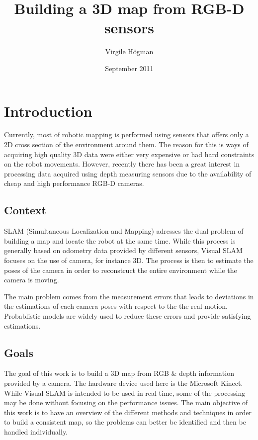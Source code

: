 \documentclass[a4paper,11pt]{kth-mag}
\title{Building a 3D map from RGB-D sensors}
\author{Virgile H\"{o}gman}
\date{September 2011}
\begin{document}
\frontmatter
\maketitle

\clearpage
{}
\clearpage
\tableofcontents
\mainmatter

\chapter{Introduction}

Currently, most of robotic mapping is performed using sensors that offers only a 2D cross section of the environment around them. The reason for this is ways of acquiring high quality 3D data were either very expensive or had hard constraints on the robot movements. However, recently there has been a great interest in processing data acquired using depth measuring sensors due to the availability of cheap and high performance RGB-D cameras. 

\section{Context}

SLAM (Simultaneous Localization and Mapping) adresses the dual problem of building a map and locate the robot at the same time. While this process is generally based on odometry data provided by different sensors, Visual SLAM focuses on the use of camera, for instance 3D. The process is then to estimate the poses of the camera in order to reconstruct the entire environment while the camera is moving.

The main problem comes from the measurement errors that leads to deviations in the estimations of each camera poses with respect to the the real motion. Probablistic models are widely used to reduce these errors and provide satisfying estimations.

\section{Goals}

The goal of this work is to build a 3D map from RGB \& depth information provided by a camera. The hardware device used here is the Microsoft Kinect. While Visual SLAM is intended to be used in real time, some of the processing may be done without focusing on the performance issues. The main objective of this work is to have an overview of the different methods and techniques in order to build a consistent map, so the problems can better be identified and then be handled individually.
\end{document}
